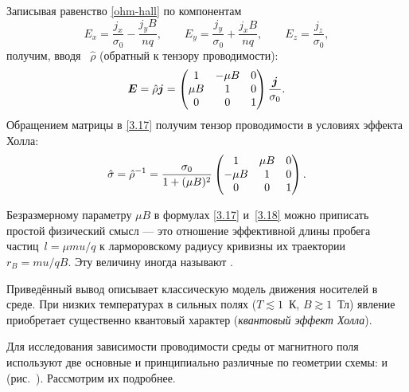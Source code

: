Записывая равенство \eqref{ohm-hall} по компонентам
\[
E_x = \frac{j_x}{\sigma_0}  -  \frac{j_y B}{nq} ,\qquad
    E_y = \frac{j_y}{\sigma_0} +  \frac{j_xB}{nq} ,\qquad
    E_z = \frac{j_z}{\sigma_0},
\]
получим, вводя
~$\hat{\rho}$ (обратный к тензору
проводимости):
\begin{equation}
    \vec{E}=\hat{\rho}\vec{j}= \left(
    \begin{matrix}
        1 & -\mu B & {0} \\
        \mu B & 1 & {0} \\
        {0} &{0}& 1
    \end{matrix}
    \right)
    \frac{\vec{j}}{\sigma_0}.
    \eqmark{3.17}
\end{equation}
Обращением матрицы в \eqref{3.17} получим тензор проводимости
в условиях эффекта Холла:
\begin{equation}
    \hat{\sigma} = \hat{\rho}^{-1}=
    \frac{\sigma_0}{1+(\mu B)^2}\left(
    \begin{matrix}
        {1} & \mu B & {0} \\
        -\mu B & 1 & {0} \\
        {0} &{0}& 1 \\
    \end{matrix}
    \right).
    \eqmark{3.18}
\end{equation}

Безразмерному параметру $\mu B$ в формулах 
\eqref{3.17} и~\eqref{3.18} можно приписать простой
физический смысл --- это отношение эффективной длины пробега 
частиц~$l= \mu m u/q$ к ларморовскому радиусу кривизны их траектории $r_B=mu/qB$.
Эту величину иногда называют . 

\begin{lab:note}
Приведённый вывод описывает классическую модель движения носителей
в среде. При низких температурах  в сильных полях ($T\lesssim 1$~К, $B\gtrsim1$~Тл)
явление приобретает существенно квантовый характер
(\emph{квантовый эффект Холла}). 
\end{lab:note}



Для исследования зависимости проводимости среды от магнитного поля 
используют две основные и принципиально различные по геометрии схемы: 
 и  (рис.~).
Рассмотрим их подробнее.

